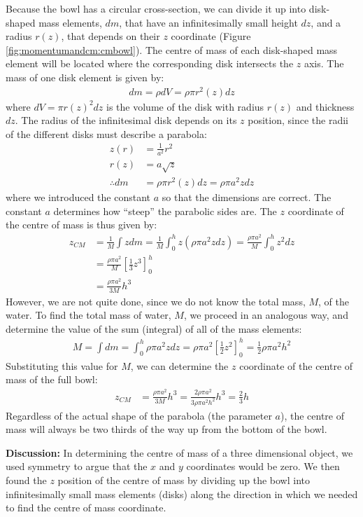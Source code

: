 \begin{example}
Because the bowl has a circular cross-section, we can divide it up into disk-shaped mass elements, $dm$, that have an infinitesimally small height $dz$, and a radius $r(z)$, that depends on their $z$ coordinate (Figure \ref{fig:momentumandcm:cmbowl}). 
The centre of mass of each disk-shaped mass element will be located where the corresponding disk intersects the $z$ axis. The mass of one disk element is given by:
\begin{align*}
dm = \rho dV = \rho \pi r^2(z) dz
\end{align*}
where $dV = \pi r(z)^2 dz$ is the volume of the disk with radius $r(z)$ and thickness $dz$. The radius of the infinitesimal disk depends on its $z$ position, since the radii of the different disks must describe a parabola:
\begin{align*}
z(r) &= \frac{1}{a^2}r^2\\
r(z) &= a\sqrt z\\
\therefore dm &= \rho \pi r^2(z) dz= \rho \pi a^2  z dz
\end{align*}
where we introduced the constant $a$ so that the dimensions are correct. The constant $a$ determines how ``steep'' the parabolic sides are. The $z$ coordinate of the centre of mass is thus given by:
\begin{align*}
z_{CM} &=  \frac{1}{M}\int z dm =\frac{1}{M}\int_0^h z  (\rho \pi a^2 z dz)=\frac{\rho \pi a^2}{M}\int_0^h z^2dz \\
&=\frac{\rho \pi a^2}{M}\left[ \frac{1}{3}z^3 \right]_0^h\\
&=\frac{\rho \pi a^2}{3M}h^3
\end{align*}
However, we are not quite done, since we do not know the total mass, $M$, of the water. To find the total mass of water, $M$, we proceed in an analogous way, and determine the value of the sum (integral) of all of the mass elements:
\begin{align*}
M = \int dm = \int_0^h \rho \pi a^2 z dz = \rho \pi a^2 \left[ \frac{1}{2}z^2 \right]_0^h= \frac{1}{2}\rho \pi a^2 h^2
\end{align*}
Substituting this value for $M$, we can determine the $z$ coordinate of the centre of mass of the full bowl:
\begin{align*}
z_{CM} &=\frac{\rho \pi a^2}{3M}h^3 = \frac{2\rho \pi a^2}{3\rho \pi a^2 h^2}h^3=\frac{2}{3}h
\end{align*}
Regardless of the actual shape of the parabola (the parameter $a$), the centre of mass will always be two thirds of the way up from the bottom of the bowl.

\textbf{Discussion: }In determining the centre of mass of a three dimensional object, we used symmetry to argue that the $x$ and $y$ coordinates would be zero. We then found the $z$ position of the centre of mass by dividing up the bowl into infinitesimally small mass elements (disks) along the direction in which we needed to find the centre of mass coordinate.
\end{example}

